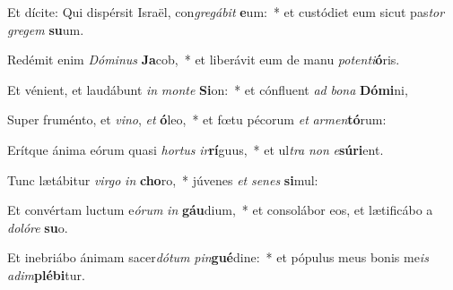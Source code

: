 \item Et dícite: Qui dispérsit Israël, con\textit{gre}\textit{gá}\textit{bit} \textbf{e}um:~* et custódiet eum sicut pas\textit{tor} \textit{gre}\textit{gem} \textbf{su}um.
\item Redémit enim \textit{Dó}\textit{mi}\textit{nus} \textbf{Ja}cob,~* et liberávit eum de manu \textit{pot}\textit{en}\textit{ti}\textbf{ó}ris.
\item Et vénient, et laudábunt \textit{in} \textit{mon}\textit{te} \textbf{Si}on:~* et cónfluent \textit{ad} \textit{bo}\textit{na} \textbf{Dó}\textbf{mi}ni,
\item Super fruménto, et \textit{vi}\textit{no}, \textit{et} \textbf{ó}leo,~* et fœtu pécorum \textit{et} \textit{ar}\textit{men}\textbf{tó}rum:
\item Erítque ánima eórum quasi \textit{hor}\textit{tus} \textit{ir}\textbf{rí}guus,~* et ul\textit{tra} \textit{non} \textit{e}\textbf{sú}\textbf{ri}ent.
\item Tunc lætábitur \textit{vir}\textit{go} \textit{in} \textbf{cho}ro,~* júvenes \textit{et} \textit{se}\textit{nes} \textbf{si}mul:
\item Et convértam luctum e\textit{ó}\textit{rum} \textit{in} \textbf{gáu}dium,~* et consolábor eos, et lætificábo a \textit{do}\textit{ló}\textit{re} \textbf{su}o.
\item Et inebriábo ánimam sacer\textit{dó}\textit{tum} \textit{pin}\textbf{gué}dine:~* et pópulus meus bonis me\textit{is} \textit{ad}\textit{im}\textbf{plé}\textbf{bi}tur.
